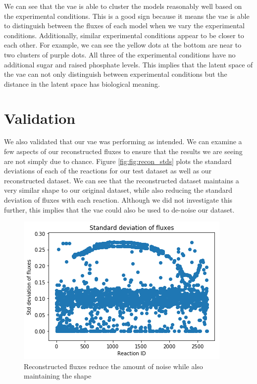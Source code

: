 We can see that the \gls{vae} is able to cluster the models reasonably well based on the experimental conditions.
This is a good sign because it means the \gls{vae} is able to distinguish between the fluxes of each model when we vary the experimental conditions.
Additionally, similar experimental conditions appear to be closer to each other.
For example, we can see the yellow dots at the bottom are near to two clusters of purple dots.
All three of the experimental conditions have no additional sugar and raised phosphate levels.
This implies that the latent space of the \gls{vae} can not only distinguish between experimental conditions but the distance in the latent space has biological meaning.

\section{Validation}
We also validated that our \gls{vae} was performing as intended.
We can examine a few aspects of our reconstructed fluxes to ensure that the results we are seeing are not simply due to chance.
Figure \ref{fig:fig:recon_stds} plots the standard deviations of each of the reactions for our test dataset as well as our reconstructed dataset.
We can see that the reconstructed dataset maintains a very similar shape to our original dataset, while also reducing the standard deviation of fluxes with each reaction.
Although we did not investigate this further, this implies that the \gls{vae} could also be used to de-noise our dataset.

\begin{figure}[t!]
\begin{center}
\includegraphics{figs/Reconstructed_stds.png}
\caption{Reconstructed fluxes reduce the amount of noise while also maintaining the shape}
\end{center}
\label{fig:recon_stds}
\end{figure}

